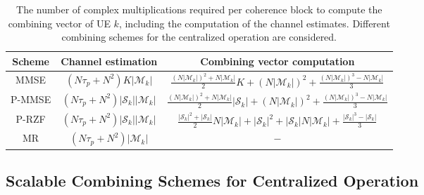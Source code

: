 \begin{table} 
\centering
    \begin{tabular}{|c|c|c|} \hline
    Scheme & {Channel estimation} & Combining vector computation \\ \hline \hline
        \gls{MMSE} & $(N\tau_p + N^2)K |\mathcal{M}_k|$ & $\frac{\left(N|\mathcal{M}_k|\right)^2 + N|\mathcal{M}_k|}{2} K + \left(N|\mathcal{M}_k|\right)^2+\frac{\left(N|\mathcal{M}_k|\right)^3-N|\mathcal{M}_k|}{3} $ \\ \hline
            P-MMSE & $(N\tau_p + N^2)|\mathcal{S}_k| |\mathcal{M}_k|$ & $\frac{\left(N|\mathcal{M}_k|\right)^2 + N|\mathcal{M}_k|}{2} |\mathcal{S}_k| + \left(N|\mathcal{M}_k|\right)^2+\frac{\left(N|\mathcal{M}_k|\right)^3-N|\mathcal{M}_k|}{3} $  \\ \hline
                P-RZF & $(N\tau_p + N^2)|\mathcal{S}_k| |\mathcal{M}_k|$ & $\frac{|\mathcal{S}_k|^2+|\mathcal{S}_k|}{2}N|\mathcal{M}_k| +|\mathcal{S}_k|^2+ |\mathcal{S}_k|N|\mathcal{M}_k|+\frac{|\mathcal{S}_k|^3-|\mathcal{S}_k|}{3} $  \\ \hline
                    \gls{MR} & $(N\tau_p + N^2) |\mathcal{M}_k|$ & $-$ \\ \hline
    \end{tabular}
    \caption{The number of complex multiplications required per coherence block to compute the combining vector of UE $k$, including the computation of the channel estimates.
    Different combining schemes for the centralized operation are considered.} 
     \label{table:complexity-with-level4}
\end{table}




\subsection{Scalable Combining Schemes for Centralized Operation}
\label{subsec:scalable-combining}

